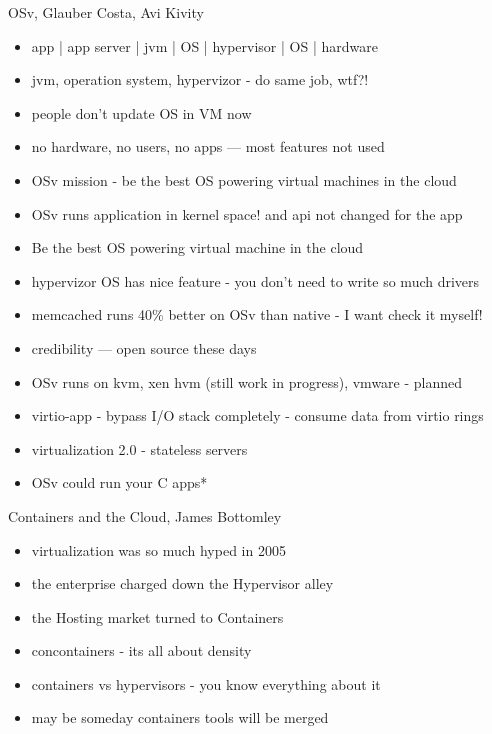 \documentclass[aspectratio=169]{beamer}
\begin{document}
\begin{frame}{OSv, Glauber Costa, Avi Kivity}
  \begin{itemize}
  \item app | app server | jvm | OS | hypervisor | OS | hardware
  \item jvm, operation system, hypervizor - do same job, wtf?!
  \item people don't update OS in VM now
  \item no hardware, no users, no apps --- most features not used
  \item OSv mission - be the best OS powering virtual machines in the cloud
  \item OSv runs application in kernel space! and api not changed for the app
  \item Be the best OS powering virtual machine in the cloud
  \item hypervizor OS has nice feature - you don't need to write so much drivers
  \item memcached runs 40\% better on OSv than native - I want check it myself!
  \item credibility --- open source these days
  \item OSv runs on kvm, xen hvm (still work in progress), vmware - planned
  \item virtio-app - bypass I/O stack completely - consume data from virtio rings
  \item virtualization 2.0 - stateless servers
  \item OSv could run your C apps*
  \end{itemize}
\end{frame}

\begin{frame}{Containers and the Cloud, James Bottomley}
  \begin{itemize}
  \item virtualization was so much hyped in 2005
  \item the enterprise charged down the Hypervisor alley
  \item the Hosting market turned to Containers
  \item concontainers - its all about density
  \item containers vs hypervisors - you know everything about it
  \item may be someday containers tools will be merged
  \end{itemize}
\end{frame}
\end{document}
